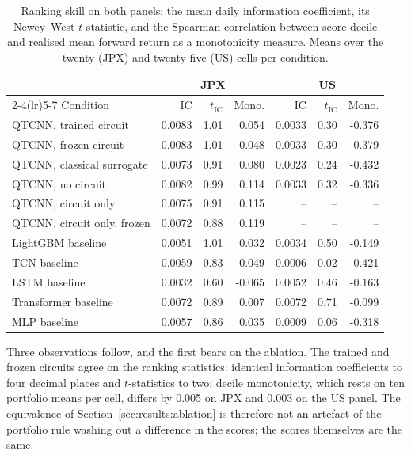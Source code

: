 \begin{table}[t]
  \centering
  \caption{Ranking skill on both panels: the mean daily information
  coefficient, its Newey--West $t$-statistic, and the Spearman correlation
  between score decile and realised mean forward return as a monotonicity
  measure. Means over the twenty (JPX) and twenty-five (US) cells per condition.}
  \label{tab:ic}
  \small
  \begin{tabular}{lrrrrrr}
    \toprule
    & \multicolumn{3}{c}{JPX} & \multicolumn{3}{c}{US} \\
    \cmidrule(lr){2-4}\cmidrule(lr){5-7}
    Condition & IC & $t_{\mathrm{IC}}$ & Mono. & IC & $t_{\mathrm{IC}}$ & Mono. \\
    \midrule
    QTCNN, trained circuit     & 0.0083 &  1.01 &  0.054 & 0.0033 &  0.30 & -0.376 \\
    QTCNN, frozen circuit      & 0.0083 &  1.01 &  0.048 & 0.0033 &  0.30 & -0.379 \\
    QTCNN, classical surrogate & 0.0073 &  0.91 &  0.080 & 0.0023 &  0.24 & -0.432 \\
    QTCNN, no circuit          & 0.0082 &  0.99 &  0.114 & 0.0033 &  0.32 & -0.336 \\
    QTCNN, circuit only        & 0.0075 &  0.91 &  0.115 &   --   &   --  &   --   \\
    QTCNN, circuit only, frozen & 0.0072 &  0.88 &  0.119 &   --   &   --  &   --   \\
    LightGBM baseline          & 0.0051 &  1.01 &  0.032 & 0.0034 &  0.50 & -0.149 \\
    TCN baseline               & 0.0059 &  0.83 &  0.049 & 0.0006 &  0.02 & -0.421 \\
    LSTM baseline              & 0.0032 &  0.60 & -0.065 & 0.0052 &  0.46 & -0.163 \\
    Transformer baseline       & 0.0072 &  0.89 &  0.007 & 0.0072 &  0.71 & -0.099 \\
    MLP baseline               & 0.0057 &  0.86 &  0.035 & 0.0009 &  0.06 & -0.318 \\
    \bottomrule
  \end{tabular}
\end{table}

Three observations follow, and the first bears on the ablation. The
trained and frozen circuits agree on the ranking statistics: identical
information coefficients to four decimal places and $t$-statistics to two;
decile monotonicity, which rests on ten portfolio means per cell, differs by
\num{0.005} on JPX and \num{0.003} on the US panel. The equivalence of
Section~\ref{sec:results:ablation} is therefore not an artefact of the
portfolio rule washing out a difference in the scores; the scores themselves
are the same.

